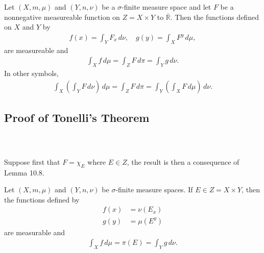 \documentclass{beamer}
\numberwithin{equation}{section}
\begin{document}
\begin{frame}\frametitle{{\normalsize \secname} \\ {\large \subsecname}}
    \begingroup
    \small
    \begin{theorem}
        Let $(X, m, \mu)$ and $(Y, n, \nu)$ be a $\sigma$-finite measure space and let $F$ be a nonnegative measureable function on $Z = X \times Y$ to $\overline{\mathbb{R}}$.
        Then the functions defined on $X$ and $Y$ by
        \begin{align}\label{eq:b10.4}
            f(x) = \int_Y F_x \, d\nu, \quad
            g(y) = \int_X F^y \, d\mu,
        \end{align}
        are measureable and
        \begin{align}\label{eq:b10.5}
            \int_X f \, d\mu = \int_Z F \, d\pi = \int_Y g \, d\nu.
        \end{align}
        In other symbols,
        \begin{align}\label{eq:b10.6}
            \int_X\left(\int_Y F \, d\nu \right) \, d\mu =
            \int_Z F \, d\pi =
            \int_Y\left(\int_X F \, d\mu \right) \, d\nu.
        \end{align}
    \end{theorem}
    \endgroup
\end{frame}

\subsection{Proof of Tonelli's Theorem}

\begin{frame}\frametitle{{\normalsize \secname} \\ {\large \subsecname}}
    Suppose first that $F = \chi_E$ where $E \in Z$, the result is then a consequence of Lemma 10.8.
    \begin{lemma}[10.8]
        Let $(X, m, \mu)$ and $(Y, n, \nu)$ be $\sigma$-finite measure spaces.
        If $E \in Z = X \times Y$, then the functions defined by
        \begin{align*}
            f(x) &= \nu(E_x)\\
            g(y) &= \mu(E^y)
        \end{align*}
        are measurable and 
        \begin{align*}
            \int_X f \, d\mu = \pi(E) = \int_Y g \, d\nu.
        \end{align*}
    \end{lemma}
\end{frame}
\end{document}
